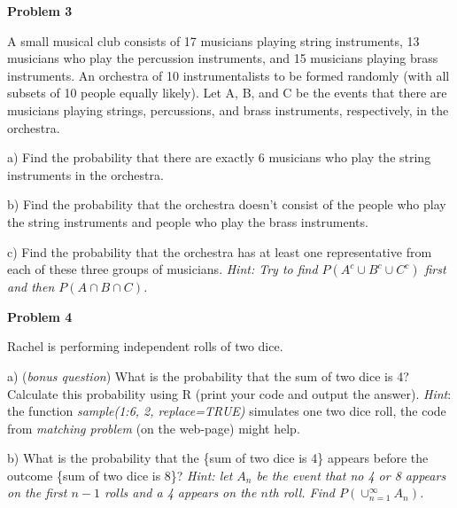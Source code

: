 \documentclass[12pt]{article}
\begin{document}
\begin{flushleft}
\par
\setlength{\parskip}{1em}
\par
\textbf{Problem 3}
\par
\setlength{\parskip}{1em}
\par
A small musical club consists of 17 musicians playing string instruments, 13 musicians who play the percussion instruments, and 15 musicians playing brass instruments. An orchestra of 10 instrumentalists to be formed randomly (with all subsets of 10 people equally likely). Let A, B, and C be the events that there are musicians playing strings, percussions, and brass instruments, respectively, in the orchestra.
\par
	a) Find the probability that there are exactly 6 musicians who play the string instruments in the orchestra.
\par
\hfill\vspace{0.5in} 
\par
	b) Find the probability that the orchestra doesn't consist of the people who play the string instruments and people who play the brass instruments.
\par
\hfill\vspace{0.4in} 
\newpage
	c) Find the probability that the orchestra has at least one representative from each of these three groups of musicians. \textit{Hint: Try to find $P(A^c \cup B^c \cup C^c)$ first and then $P(A \cap B \cap C)$.} 
\par
\hfill\vspace{0.7in} 
\par

\par
\textbf{Problem 4}
\par
\setlength{\parskip}{1em}
\par
Rachel is performing independent rolls of two dice. 
\par
a) (\textit{bonus question}) What is the probability that the sum of two dice is 4? Calculate this probability using R (print your code and output the answer). \textit{Hint}: the function \textit{sample(1:6, 2, replace=TRUE)} simulates one two dice roll, the code from \textit{matching problem} (on the web-page) might help.
\par
\hfill\vspace{1in} 
\par
b) What is the probability that the \{sum of two dice is 4\} appears before the outcome \{sum of two dice is 8\}? \textit{Hint: let $A_n$ be the event that no 4 or 8 appears on the first $n-1$ rolls and a 4 appears on the $n$th roll. Find $P(\cup_{n=1}^\infty A_n)$.}
\par
\hfill\vspace{2in} 
\par


\end{flushleft}
\end{document}
